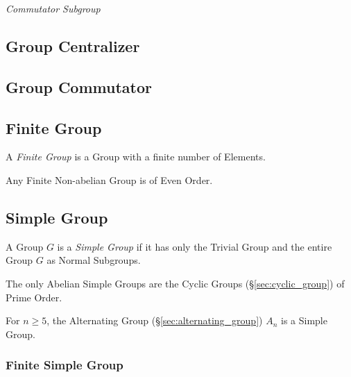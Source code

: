 \emph{Commutator Subgroup}



\subsection{Group Centralizer}\label{sec:group_centralizer}

\subsection{Group Commutator}\label{sec:group_commutator}


\subsection{Finite Group}\label{sec:finite_group}

A \emph{Finite Group} is a Group with a finite number of Elements.

Any Finite Non-abelian Group is of Even Order.



\subsection{Simple Group}\label{sec:simple_group}

A Group $G$ is a \emph{Simple Group} if it has only the Trivial Group
and the entire Group $G$ as Normal Subgroups.

The only Abelian Simple Groups are the Cyclic Groups
(\S\ref{sec:cyclic_group}) of Prime Order.

For $n \geq 5$, the Alternating Group (\S\ref{sec:alternating_group})
$A_n$ is a Simple Group.



\subsubsection{Finite Simple Group}\label{sec:finite_simple_group}



